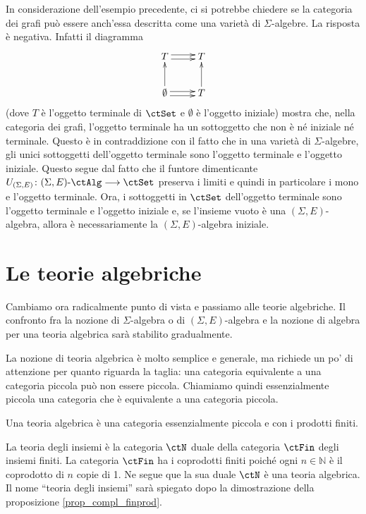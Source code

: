 \begin{example}\label{esempio_grafi_noneq}
 In considerazione dell'esempio precedente, ci si potrebbe chiedere se la categoria dei grafi può essere anch'essa descritta come una
 varietà di \(\Sigma\)-algebre. La risposta è negativa. Infatti il diagramma
 \[\xymatrix{T \ar@<-0.5ex>[r] \ar@<0.5ex>[r] & T \\
   \emptyset \ar@<-0.5ex>[r] \ar@<0.5ex>[r]  \ar[u] & T \ar[u] }\]
 (dove \(T\) è l'oggetto terminale di \(\ctSet\) e \(\emptyset\) è l'oggetto iniziale) mostra che, nella categoria dei grafi, l'oggetto terminale
 ha un sottoggetto che non è né iniziale né terminale. Questo è in contraddizione con il fatto che in una varietà di \(\Sigma\)-algebre,
 gli unici sottoggetti dell'oggetto terminale sono l'oggetto terminale e l'oggetto iniziale. Questo segue dal fatto che il funtore dimenticante
 \(U_{(\Sigma,E)} \colon \ctSEAlg \fun \ctSet\) preserva i limiti e quindi in particolare i mono e l'oggetto terminale. Ora, i sottoggetti in \(\ctSet\)
 dell'oggetto terminale sono l'oggetto terminale e l'oggetto iniziale e, se l'insieme vuoto è una \((\Sigma,E)\)-algebra, allora è
 necessariamente la \((\Sigma,E)\)-algebra iniziale.
\end{example}

\section{Le teorie algebriche}\label{sec_teorie_alg}

Cambiamo ora radicalmente punto di vista e passiamo alle teorie algebriche. Il confronto fra la nozione di \(\Sigma\)-algebra
o di \((\Sigma,E)\)-algebra e la nozione di algebra per una teoria algebrica sarà stabilito gradualmente.

La nozione di teoria algebrica è molto semplice e generale, ma richiede un po' di attenzione per quanto riguarda la taglia: una
categoria equivalente a una categoria piccola può non essere piccola. Chiamiamo quindi essenzialmente piccola una categoria
che è equivalente a una categoria piccola.

\begin{definition}\label{def_teoria_alg}
 Una teoria algebrica è una categoria essenzialmente piccola e con i prodotti finiti.
\end{definition}

\begin{example}\label{esempio_teoria_set}
 La teoria degli insiemi è la categoria \(\ctN\) duale della categoria \(\ctFin\) degli insiemi finiti. La categoria \(\ctFin\) ha i coprodotti
 finiti poiché ogni \(n \in \mathbb N\) è il coprodotto di \(n\) copie di 1. Ne segue que la sua duale \(\ctN\) è una teoria algebrica.
 Il nome ``teoria degli insiemi'' sarà spiegato dopo la dimostrazione della proposizione \ref{prop_compl_finprod}.
\end{example}

